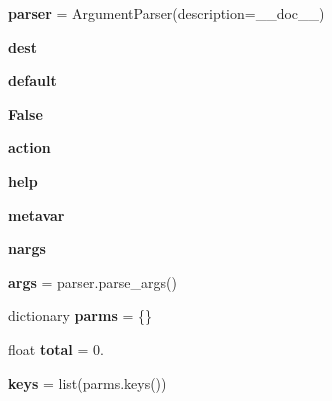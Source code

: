 \begin{DoxyCompactItemize}
\item 
\mbox{\label{namespacepymavlink_1_1tools_1_1mavparms_abd5bf4b8edf8066f393ef01047150db3}} 
{\bfseries parser} = Argument\+Parser(description=\+\_\+\+\_\+doc\+\_\+\+\_\+)
\item 
\mbox{\label{namespacepymavlink_1_1tools_1_1mavparms_ae8257e4c1de9553194d17207a86a112c}} 
{\bfseries dest}
\item 
\mbox{\label{namespacepymavlink_1_1tools_1_1mavparms_a0c74e867bb0c2fe3a7d103c99cbf61cf}} 
{\bfseries default}
\item 
\mbox{\label{namespacepymavlink_1_1tools_1_1mavparms_a8603a388c99f72e5408543ec0432df20}} 
{\bfseries False}
\item 
\mbox{\label{namespacepymavlink_1_1tools_1_1mavparms_ac3b752a6d40c36b801353d1fc4896fd3}} 
{\bfseries action}
\item 
\mbox{\label{namespacepymavlink_1_1tools_1_1mavparms_af8ace9de095be86b4e3cc4174646e70e}} 
{\bfseries help}
\item 
\mbox{\label{namespacepymavlink_1_1tools_1_1mavparms_abb05e0331b316963e2c81d834b757e61}} 
{\bfseries metavar}
\item 
\mbox{\label{namespacepymavlink_1_1tools_1_1mavparms_a1280df9dc56e20275e61dca76693ef16}} 
{\bfseries nargs}
\item 
\mbox{\label{namespacepymavlink_1_1tools_1_1mavparms_a4662189bac9fd0d1bce1ac1dab0e97b8}} 
{\bfseries args} = parser.\+parse\+\_\+args()
\item 
\mbox{\label{namespacepymavlink_1_1tools_1_1mavparms_a21ffbe397fd9d7863328a0214b9b8f99}} 
dictionary {\bfseries parms} = \{\}
\item 
\mbox{\label{namespacepymavlink_1_1tools_1_1mavparms_a6271ff9e3daaa2fd996e1fa2e6967bf5}} 
float {\bfseries total} = 0.
\item 
\mbox{\label{namespacepymavlink_1_1tools_1_1mavparms_a6af3ade534f0b7d99e4082a023acdbb8}} 
{\bfseries keys} = list(parms.\+keys())
\end{DoxyCompactItemize}


